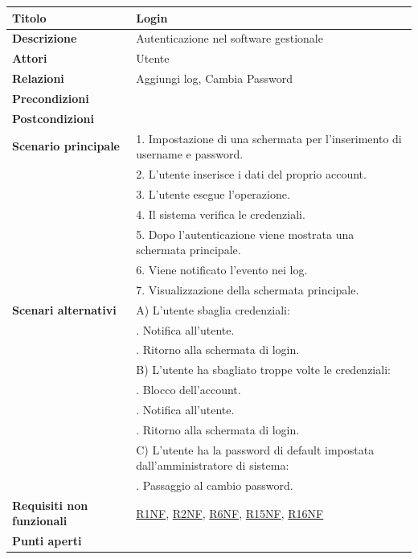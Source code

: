 \documentclass[a4paper]{article}
\begin{document}


  \begin{center}
    \begin{tabularx}{1\textwidth}{l|X}
        \textbf{Titolo} & Login \\
        \hline
        \textbf{Descrizione} & Autenticazione nel software gestionale \\
        \hline
        \textbf{Attori} & Utente \\
        \hline
        \textbf{Relazioni} & Aggiungi log, Cambia Password \\
        \hline
        \textbf{Precondizioni} &  \\
        \hline
        \textbf{Postcondizioni} &  \\
        \hline
        \textbf{Scenario principale} & 1. Impostazione di una schermata per l'inserimento di username e password. \\
                                     & 2. L'utente inserisce i dati del proprio account. \\
                                     & 3. L'utente esegue l'operazione. \\
                                     & 4. Il sistema verifica le credenziali. \\
                                     & 5. Dopo l'autenticazione viene mostrata una schermata principale.\\
                                     & 6. Viene notificato l'evento nei log.\\
                                     & 7. Visualizzazione della schermata principale.\\
        \hline
        \textbf{Scenari alternativi} & A) L'utente sbaglia credenziali: \\
                                     & \quad 1. Notifica all'utente.\\
                                     & \quad 2. Ritorno alla schermata di login.\\
                                     & B) L'utente ha sbagliato troppe volte le credenziali: \\
                                     & \quad 1. Blocco dell'account.\\
                                     & \quad 2. Notifica all'utente.\\
                                     & \quad 3. Ritorno alla schermata di login.\\
                                     & C) L'utente ha la password di default impostata dall'amministratore di sistema:\\
                                     & \quad 1. Passaggio al cambio password.\\
        \hline
        \textbf{Requisiti non funzionali} & \hyperlink{R1NF}{R1NF}, \hyperlink{R2NF}{R2NF}, \hyperlink{R6NF}{R6NF}, \hyperlink{R15NF}{R15NF}, \hyperlink{R16NF}{R16NF} \\
        \hline
        \textbf{Punti aperti} & \\
        \hline
    \end{tabularx}
  \end{center}
\end{document}
